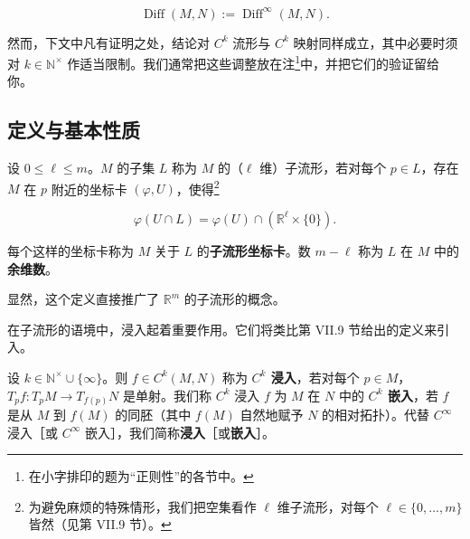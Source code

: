 \[
\operatorname{Diff}(M,N):=\operatorname{Diff}^\infty(M,N).
\]

然而，下文中凡有证明之处，结论对 $ C^k $ 流形与 $ C^k $ 映射同样成立，其中必要时须对 $ k\in\mathbb{N}^\times $ 作适当限制。我们通常把这些调整放在注\footnote{在小字排印的题为“正则性”的各节中。}中，并把它们的验证留给你。

\subsection*{定义与基本性质}

设 $ 0\le\ell\le m $。$ M $ 的子集 $ L $ 称为 $ M $ 的（$ \ell $ 维）子流形，若对每个 $ p\in L $，存在 $ M $ 在 $ p $ 附近的坐标卡 $ (\varphi,U) $，使得\footnote{为避免麻烦的特殊情形，我们把空集看作 $ \ell $ 维子流形，对每个 $ \ell\in\{0,\ldots,m\} $ 皆然（见第 VII.9 节）。}

\[
\varphi(U\cap L)=\varphi(U)\cap(\mathbb{R}^\ell\times\{0\}).
\]

每个这样的坐标卡称为 $ M $ 关于 $ L $ 的\textbf{子流形坐标卡}。数 $ m-\ell $ 称为 $ L $ 在 $ M $ 中的\textbf{余维数}。


显然，这个定义直接推广了 $ \mathbb{R}^m $ 的子流形的概念。

在子流形的语境中，浸入起着重要作用。它们将类比第 VII.9 节给出的定义来引入。

设 $ k\in\mathbb{N}^\times\cup\{\infty\} $。则 $ f\in C^k(M,N) $ 称为 \textbf{$ C^k $ 浸入}，若对每个 $ p\in M $，$ T_p f:T_pM\to T_{f(p)}N $ 是单射。我们称 $ C^k $ 浸入 $ f $ 为 $ M $ 在 $ N $ 中的 \textbf{$ C^k $ 嵌入}，若 $ f $ 是从 $ M $ 到 $ f(M) $ 的同胚（其中 $ f(M) $ 自然地赋予 $ N $ 的相对拓扑）。代替 $ C^\infty $ 浸入［或 $ C^\infty $ 嵌入］，我们简称\textbf{浸入}［或\textbf{嵌入}］。

